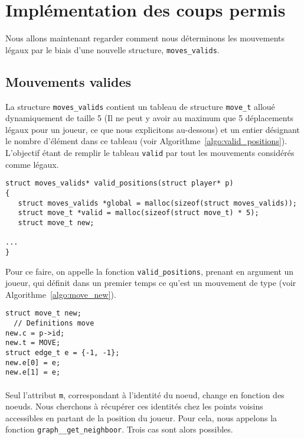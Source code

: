 \documentclass[a4paper]{article}
\begin{document}
\section{Implémentation des coups permis}

Nous allons maintenant regarder comment nous déterminons les mouvements légaux par le biais d'une nouvelle structure, \texttt{moves\_valids}.

\subsection{Mouvements valides}

La structure \texttt{moves\_valids} contient un tableau de structure \texttt{move\_t} alloué dynamiquement de taille 5 (Il ne peut y avoir au maximum que 5 déplacements légaux pour un joueur, ce que nous explicitons au-dessous) et un entier désignant le nombre d'élément dans ce tableau (voir Algorithme~\ref{algo:valid_positions}). L'objectif étant de remplir le tableau \texttt{valid} par tout les mouvements considérés comme légaux. \\

\begin{lstlisting}[caption = {Entête de la fonction définissant les mouvements possibles}, label = {algo:valid_positions}, float = h]
struct moves_valids* valid_positions(struct player* p)
{
   struct moves_valids *global = malloc(sizeof(struct moves_valids)); 
   struct move_t *valid = malloc(sizeof(struct move_t) * 5);
   struct move_t new; 
  
...
}
\end{lstlisting}

Pour ce faire, on appelle la fonction \texttt{valid\_positions}, prenant en argument un joueur, qui définit dans un premier temps ce qu'est un mouvement de type  (voir Algorithme~\ref{algo:move_new}). \\

\begin{lstlisting}[caption = {Définition d'un mouvement}, label = {algo:move_new}]
struct move_t new; 
  // Definitions move
new.c = p->id; 
new.t = MOVE; 
struct edge_t e = {-1, -1};
new.e[0] = e;
new.e[1] = e;  
\end{lstlisting}
\paragraph{}
Seul l'attribut \texttt{m}, correspondant à l'identité du noeud, change en fonction des noeuds. Nous cherchons à récupérer ces identités chez les points voisins accessibles en partant de la position du joueur. Pour cela, nous appelons la fonction \texttt{graph\_\_get\_neighboor}. Trois cas sont alors possibles. \\
\end{document}
